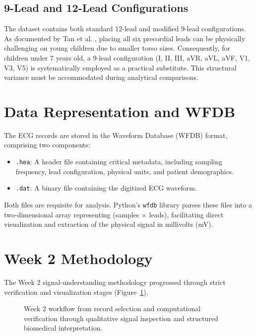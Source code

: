 \documentclass[11pt, a4paper]{article}
\begin{document}
\subsection{9-Lead and 12-Lead Configurations}
The dataset contains both standard 12-lead and modified 9-lead configurations. As documented by Tan et al. \cite{Tan2025}, placing all six precordial leads can be physically challenging on young children due to smaller torso sizes. Consequently, for children under 7 years old, a 9-lead configuration (I, II, III, aVR, aVL, aVF, V1, V3, V5) is systematically employed as a practical substitute. This structural variance must be accommodated during analytical comparisons.

\section{Data Representation and WFDB}
The ECG records are stored in the Waveform Database (WFDB) format, comprising two components:
\begin{itemize}
    \item \texttt{.hea}: A header file containing critical metadata, including sampling frequency, lead configuration, physical units, and patient demographics.
    \item \texttt{.dat}: A binary file containing the digitized ECG waveform.
\end{itemize}
Both files are requisite for analysis. Python's \texttt{wfdb} library parses these files into a two-dimensional array representing (samples $\times$ leads), facilitating direct visualization and extraction of the physical signal in millivolts (mV).

\section{Week 2 Methodology}
The Week 2 signal-understanding methodology progressed through strict verification and visualization stages (Figure~\ref{fig:workflow}). 

\begin{figure}[htbp]
    \centering
    \caption{Week 2 workflow from record selection and computational verification through qualitative signal inspection and structured biomedical interpretation.}
    \label{fig:workflow}
\end{figure}
\end{document}
